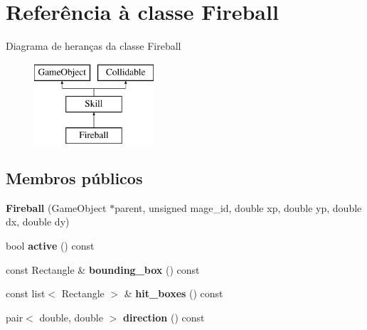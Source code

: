 \hypertarget{classFireball}{}\section{Referência à classe Fireball}
\label{classFireball}
Diagrama de heranças da classe Fireball\begin{figure}[H]
\begin{center}
\leavevmode
\includegraphics[height=3.000000cm]{classFireball}
\end{center}
\end{figure}
\subsection*{Membros públicos}
\begin{DoxyCompactItemize}
\item 
\mbox{\label{classFireball_a4035f700f882afc6e0760b4195e90ffc}} 
{\bfseries Fireball} (Game\+Object $\ast$parent, unsigned mage\+\_\+id, double xp, double yp, double dx, double dy)
\item 
\mbox{\label{classFireball_a4c669319c3cfa500f352c758f1156801}} 
bool {\bfseries active} () const
\item 
\mbox{\label{classFireball_a3c91f2eceddb1d7f317cc6961976ac68}} 
const Rectangle \& {\bfseries bounding\+\_\+box} () const
\item 
\mbox{\label{classFireball_af65513f81a16dc83b3afb6b672ffacdc}} 
const list$<$ Rectangle $>$ \& {\bfseries hit\+\_\+boxes} () const
\item 
\mbox{\label{classFireball_a312843f3db953d32b52d337bdc07cc1d}} 
pair$<$ double, double $>$ {\bfseries direction} () const
\end{DoxyCompactItemize}
